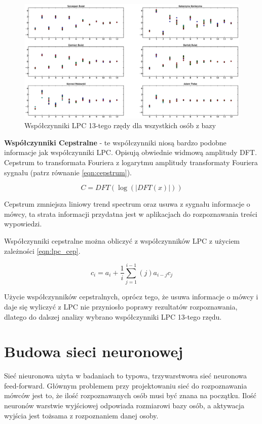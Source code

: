 \documentclass[a4paper]{article}
\begin{document}
\begin{figure}
    \includegraphics[width=\textwidth]{lpc_samochod}
    \caption{Współczynniki LPC 13-tego rzędy dla wszystkich osób z bazy}
    \label{fig:lpc}
\end{figure}

\textbf{Współczynniki Cepstralne} - te współczynniki niosą bardzo podobne
informacje jak współczynniki LPC. Opisują obwiednie widmową amplitudy DFT.
Cepstrum to transformata Fouriera z logarytmu amplitudy transformaty Fouriera
sygnału (patrz równanie \ref{eqn:cepstrum}).

\begin{equation}\label{eqn:cepstrum}
    C = DFT( \log ( | DFT (x) | ) )
\end{equation}

Cepstrum zmniejsza liniowy trend spectrum oraz usuwa z sygnału informacje o
mówcy, ta strata informacji przydatna jest w aplikacjach do rozpoznawania
treści wypowiedzi.

Współczynniki cepstralne można obliczyć z współczynników LPC z użyciem
zależności \ref{eqn:lpc_cep}.

\begin{equation}\label{eqn:lpc_cep}
    c_i = a_i + \frac{1}{i} \sum_{j=1}^{i-1} (j)a_{i-j} c_j
\end{equation}

Użycie współczynników cepstralnych, oprócz tego, że usuwa informacje o mówcy i
daje się wyliczyć z LPC nie przyniosło poprawy rezultatów rozpoznawania,
dlatego do dalszej analizy wybrano współczynniki LPC 13-tego rzędu.


\section{Budowa sieci neuronowej}

Sieć nieuronowa użyta w badaniach to typowa, trzywarstwowa sieć neuronowa
feed-forward. Głównym problemem przy projektowaniu sieć do rozpoznawania mówców
jest to, że ilość rozpoznawanych osób musi być znana na początku. Ilość
neuronów warstwie wyjściowej odpowiada rozmiarowi bazy osób, a aktywacja
wyjścia jest tożsama z rozpoznaniem danej osoby.
\end{document}
